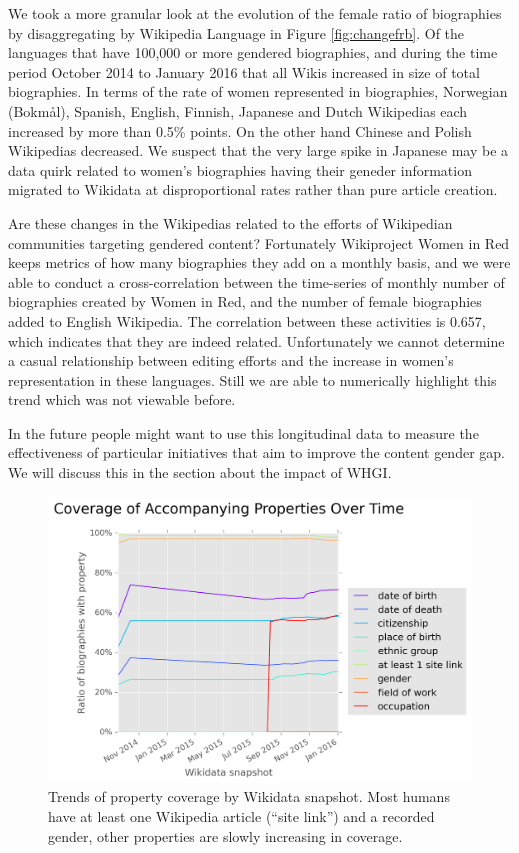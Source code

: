 \documentclass{sig-alternate-05-2015}
\begin{document}
We took a more granular look at the evolution of the female ratio of biographies by disaggregating by Wikipedia Language in Figure \ref{fig:changefrb}. Of the languages that have 100,000 or more gendered biographies, and during the time period October 2014 to January 2016 that all Wikis increased in size of total biographies. In terms of the rate of women represented in biographies, Norwegian (Bokm\aa l), Spanish, English, Finnish, Japanese and Dutch Wikipedias each increased by more than 0.5\% points. On the other hand Chinese and Polish Wikipedias decreased. 
We suspect that the very large spike in Japanese may be a data quirk related to women's biographies having their geneder information migrated to Wikidata at disproportional rates rather than pure article creation.

Are these changes in the Wikipedias related to the efforts of Wikipedian communities targeting gendered content? Fortunately Wikiproject Women in Red keeps metrics of how many biographies they add on a monthly basis, and we were able to conduct a cross-correlation between the time-series of monthly number of biographies created by Women in Red, and the number of female biographies added to English Wikipedia. The correlation between these activities is 0.657, which indicates that they are indeed related. Unfortunately we cannot determine a casual relationship between editing efforts and the increase in women's representation in these languages. Still we are able to numerically highlight this trend which was not viewable before.

In the future people might want to use this longitudinal data to measure the effectiveness of particular initiatives that aim to improve the content gender gap. We will discuss this in the section about the impact of WHGI.

\begin{figure}
\includegraphics[width=\columnwidth]{figures/additionalprops.png} 
\caption{Trends of property coverage by Wikidata snapshot. Most humans have at least one Wikipedia article (``site link'') and a recorded gender, other properties are slowly increasing in coverage.}
\label{fig:accompanying}
\end{figure}
\end{document}
